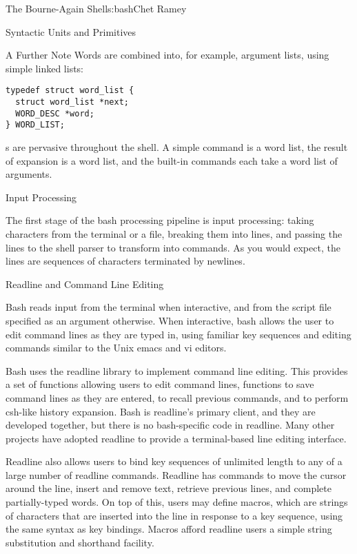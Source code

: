 \begin{aosachapter}{The Bourne-Again Shell}{s:bash}{Chet Ramey}
\begin{aosasect1}{Syntactic Units and Primitives}
\begin{aosasect2}{A Further Note}
\noindent Words are combined into, for example, argument lists, using simple
linked lists:

\begin{verbatim}
typedef struct word_list {
  struct word_list *next;
  WORD_DESC *word;
} WORD_LIST;
\end{verbatim}

s are pervasive throughout the shell.  A simple
command is a word list, the result of expansion is a word list, and
the built-in commands each take a word list of arguments.

\end{aosasect2}

\end{aosasect1}

\begin{aosasect1}{Input Processing}

The first stage of the bash processing pipeline is input processing:
taking characters from the terminal or a file, breaking them into
lines, and passing the lines to the shell parser to transform into
commands.  As you would expect, the lines are
sequences of characters terminated by newlines.

\begin{aosasect2}{Readline and Command Line Editing}

Bash reads input from the terminal when interactive, and from the
script file specified as an argument otherwise.  When interactive,
bash allows the user to edit command lines as they are typed in, using
familiar key sequences and editing commands similar to the Unix emacs
and vi editors.

Bash uses the readline library to implement command line editing.
This provides a set of functions allowing users to edit command lines,
functions to save command lines as they are entered, to recall
previous commands, and to perform csh-like history expansion.  Bash is
readline's primary client, and they are developed together, but there
is no bash-specific code in readline.  Many other projects have
adopted readline to provide a terminal-based line editing interface.

Readline also allows users to bind key sequences of unlimited length
to any of a large number of readline commands.  Readline has commands
to move the cursor around the line, insert and remove text, retrieve
previous lines, and complete partially-typed words.  On top of this,
users may define macros, which are strings of characters that are
inserted into the line in response to a key sequence, using the same
syntax as key bindings.  Macros afford readline users a simple string
substitution and shorthand facility.


\end{aosasect2}
\end{aosasect1}
\end{aosachapter}
